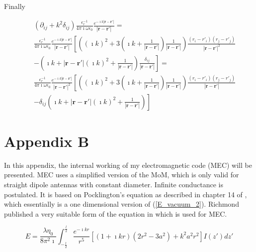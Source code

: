 \documentclass[a4paper,11pt]{thesis}
\begin{document}
Finally

\begin{eqnarray}
&&\left(  \partial_{ij}   + k^2 \delta_{ij} \right) \frac{\epsilon_r^{-1}}{4 \pi \imath \omega \epsilon_0} \frac{e^{- \imath k  | \mathbf{r}-\mathbf{r'} |}}{| \mathbf{r}-\mathbf{r'} |}=\\
&&  \frac{\epsilon_r^{-1}}{4 \pi \imath \omega \epsilon_0} \frac{e^{- \imath k | \mathbf{r}-\mathbf{r'}|}}{| \mathbf{r}-\mathbf{r'}|}\left[ \left( ( \imath k)^2+ 3 \left( \imath k + \frac{1}{| \mathbf{r}-\mathbf{r'}|} \right)\frac{1}{| \mathbf{r}-\mathbf{r'}|} \right) \frac{(r_i-r'_i)(r_j-r'_j)}{| \mathbf{r}-\mathbf{r'}|^2} \nonumber \right. \\
&&\left. -  \left(   \imath k+| \mathbf{r}-\mathbf{r'}|(\imath k)^2 + \frac{1}{| \mathbf{r}-\mathbf{r'}|}\right)  \frac{\delta_{ij}}{| \mathbf{r}-\mathbf{r'}|} \right]=\nonumber\\
&&  \frac{\epsilon_r^{-1}}{4 \pi \imath \omega \epsilon_0} \frac{e^{- \imath k | \mathbf{r}-\mathbf{r'}|}}{| \mathbf{r}-\mathbf{r'}|^2}\left[ \left( ( \imath k)^2+ 3 \left( \imath k + \frac{1}{| \mathbf{r}-\mathbf{r'}|} \right)\frac{1}{| \mathbf{r}-\mathbf{r'}|} \right) \frac{(r_i-r'_i)(r_j-r'_j)}{| \mathbf{r}-\mathbf{r'}|}\right. \nonumber \\
&& \left. -  \delta_{ij} \left(   \imath k+| \mathbf{r}-\mathbf{r'}|(\imath k)^2 + \frac{1}{| \mathbf{r}-\mathbf{r'}|}\right) \right]\nonumber
 \end{eqnarray}


\chapter{\textbf{Appendix B}}
In this appendix, the internal working of my electromagnetic code (MEC) will be presented. MEC uses a simplified version of the MoM, which is only valid for straight dipole antennas with constant diameter. Infinite conductance is postulated. It is based on Pocklington's equation as described in chapter 14 of \cite{kraus}, which essentially  is a one dimensional version of (\ref{E_vacuum_2}). Richmond published a very suitable form of the equation in \cite{richmond66} which is used for MEC.

\begin{equation}
E=\frac{\lambda \eta_0}{8 \pi^2 \imath} \int_{-\frac{l}{2}}^{\frac{l}{2}} \frac{e^{-\imath k r}}{r^5} \left[ (1+\imath k r)(2 r^2-3a^2)+k^2a^2r^2\right]I(z') dz'
\end{equation}
\end{document}
